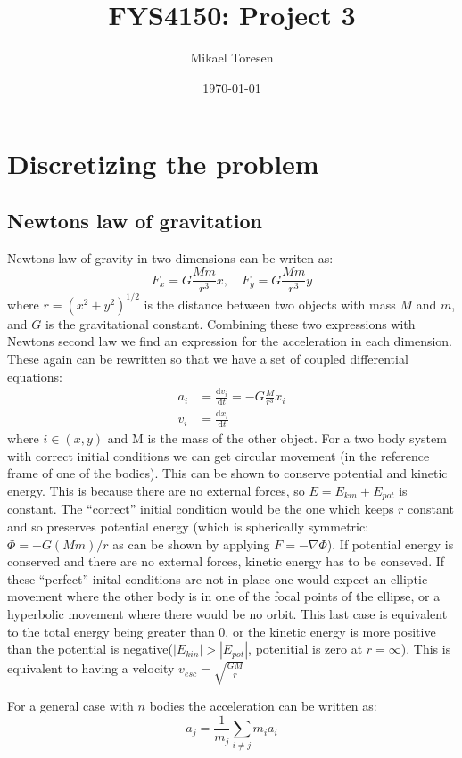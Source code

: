 \documentclass{article} %
\begin{document}
\title{FYS4150: Project 3}
\author{Mikael Toresen}
\date{\today}
\maketitle
\section{Discretizing the problem}\label{s:disc}
\subsection{Newtons law of gravitation}\label{ss:new}
Newtons law of gravity in two dimensions can be writen as:
\[F_x=G\frac{Mm}{r^3}x, \quad F_y=G\frac{Mm}{r^3}y\]
where $r=(x^2+y^2)^{1/2}$ is the distance between two objects with mass $M$ and $m$, and $G$ is the gravitational constant.
Combining these two expressions with Newtons second law we find an expression for the acceleration in each dimension. These again can be rewritten so that
we have a set of coupled differential equations:
\begin{align}
 a_i&=\frac{\mathrm{d}v_i}{\mathrm{d}t}=-G\frac{M}{r^3}x_i\label{eq:acc}\\
 v_i&=\frac{\mathrm{d}x_i}{\mathrm{d}t}\label{eq:vel}
\end{align}
where $i\in(x,y)$ and M is the mass of the other object. For a two body system with correct initial conditions we can get circular movement
(in the reference frame of one of the bodies). This can be shown to conserve potential and kinetic energy. This is because there are no external 
forces, so $E=E_{kin}+E_{pot}$ is constant. The ``correct'' initial condition would be the one which keeps $r$ constant and so preserves potential energy
(which is spherically symmetric: $\Phi=-G(Mm)/{r}$ as can be shown by applying $F=-\nabla \Phi$). If potential energy is conserved and there are no external
forces, kinetic energy has to be conseved. If these ``perfect'' inital conditions are not in place one would expect an elliptic movement where the other body is 
in one of the focal points of the ellipse, or a hyperbolic movement where there would be no orbit. This last case is equivalent to the total energy being greater than 0, or
 the kinetic energy is more positive than the potential is negative($|E_{kin}|>|E_{pot}|$, potenitial is zero at $r=\infty$). This is equivalent to having a velocity $v_{esc}=\sqrt{\frac{GM}{r}}$

For a general case with $n$ bodies the acceleration can be written as:
\[a_j=\frac{1}{m_j}\sum_{i\ne j} {m_ia_i}\]
\end{document}
